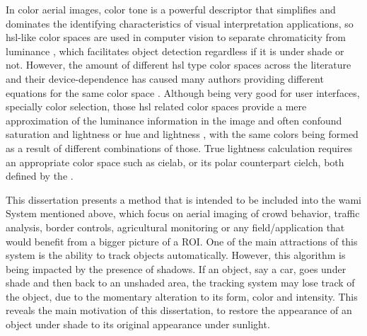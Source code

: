 %
In color aerial images, color tone is a powerful descriptor that simplifies and dominates the identifying characteristics of visual interpretation applications, so \gls{hsl}-like color spaces are used in computer vision to separate chromaticity from luminance \cite{gonzalez1992}, which facilitates object detection regardless if it is under shade or not. However, the amount of different \gls{hsl} type color spaces across the literature and their device-dependence has caused many authors providing different equations for the same color space \cite{ford1998colour}. Although being very good for user interfaces, specially color selection, those \gls{hsl} related color spaces provide a mere approximation of the luminance information in the image and often confound saturation and lightness or hue and lightness \cite{brewer1994color}, with the same colors being formed as a result of different combinations of those. True lightness calculation requires an appropriate color space such as \acrshort{cielab}, or its polar counterpart \acrshort{cielch}, both defined by the  \cite{ford1998colour}.

This dissertation presents a method that is intended to be included into the \gls{wami} System mentioned above, which focus on aerial imaging of crowd behavior, traffic analysis, border controls, agricultural monitoring or any field/application that would benefit from a bigger picture of a ROI. One of the main attractions of this system is the ability to track objects automatically. However, this algorithm is being impacted by the presence of shadows. If an object, say a car, goes under shade and then back to an unshaded area, the tracking system may lose track of the object, due to the momentary alteration to its form, color and intensity. This reveals the main motivation of this dissertation, to restore the appearance of an object under shade to its original appearance under sunlight.


